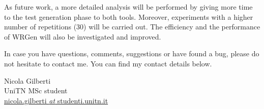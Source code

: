 

As future work, a more detailed analysis will be performed by giving more time to the test generation phase to both tools. Moreover, experiments with a higher number of repetitions (30) will be carried out. The efficiency and the performance of WRGen will also be investigated and improved.


In case you have questions, comments, suggestions or have found a bug, please do not hesitate to contact me. You can find my contact details below.

  \begin{center}
    Nicola Gilberti\\
    UniTN MSc student\\
    
    \href{mailto:nicola.gilberti@studenti.unitn.it}{\footnotesize nicola.gilberti \textit{at} studenti.unitn.it}
  \end{center}

\newpage